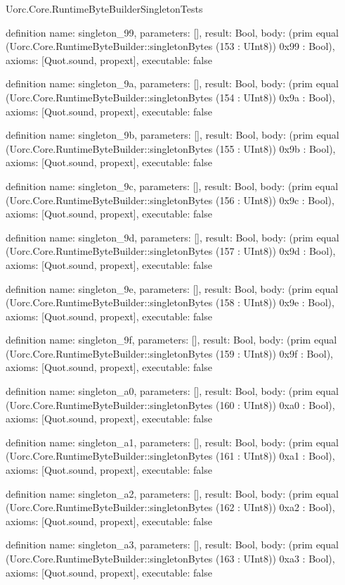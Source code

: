 \begin{lexlean}{Uorc.Core.RuntimeByteBuilderSingletonTests}
\begin{semanticmodule}
definition{
  name: singleton_99,
  parameters: [],
  result: Bool,
  body: (prim equal (Uorc.Core.RuntimeByteBuilder::singletonBytes (153 : UInt8)) 0x99 : Bool),
  axioms: [Quot.sound, propext],
  executable: false
}

definition{
  name: singleton_9a,
  parameters: [],
  result: Bool,
  body: (prim equal (Uorc.Core.RuntimeByteBuilder::singletonBytes (154 : UInt8)) 0x9a : Bool),
  axioms: [Quot.sound, propext],
  executable: false
}

definition{
  name: singleton_9b,
  parameters: [],
  result: Bool,
  body: (prim equal (Uorc.Core.RuntimeByteBuilder::singletonBytes (155 : UInt8)) 0x9b : Bool),
  axioms: [Quot.sound, propext],
  executable: false
}

definition{
  name: singleton_9c,
  parameters: [],
  result: Bool,
  body: (prim equal (Uorc.Core.RuntimeByteBuilder::singletonBytes (156 : UInt8)) 0x9c : Bool),
  axioms: [Quot.sound, propext],
  executable: false
}

definition{
  name: singleton_9d,
  parameters: [],
  result: Bool,
  body: (prim equal (Uorc.Core.RuntimeByteBuilder::singletonBytes (157 : UInt8)) 0x9d : Bool),
  axioms: [Quot.sound, propext],
  executable: false
}

definition{
  name: singleton_9e,
  parameters: [],
  result: Bool,
  body: (prim equal (Uorc.Core.RuntimeByteBuilder::singletonBytes (158 : UInt8)) 0x9e : Bool),
  axioms: [Quot.sound, propext],
  executable: false
}

definition{
  name: singleton_9f,
  parameters: [],
  result: Bool,
  body: (prim equal (Uorc.Core.RuntimeByteBuilder::singletonBytes (159 : UInt8)) 0x9f : Bool),
  axioms: [Quot.sound, propext],
  executable: false
}

definition{
  name: singleton_a0,
  parameters: [],
  result: Bool,
  body: (prim equal (Uorc.Core.RuntimeByteBuilder::singletonBytes (160 : UInt8)) 0xa0 : Bool),
  axioms: [Quot.sound, propext],
  executable: false
}

definition{
  name: singleton_a1,
  parameters: [],
  result: Bool,
  body: (prim equal (Uorc.Core.RuntimeByteBuilder::singletonBytes (161 : UInt8)) 0xa1 : Bool),
  axioms: [Quot.sound, propext],
  executable: false
}

definition{
  name: singleton_a2,
  parameters: [],
  result: Bool,
  body: (prim equal (Uorc.Core.RuntimeByteBuilder::singletonBytes (162 : UInt8)) 0xa2 : Bool),
  axioms: [Quot.sound, propext],
  executable: false
}

definition{
  name: singleton_a3,
  parameters: [],
  result: Bool,
  body: (prim equal (Uorc.Core.RuntimeByteBuilder::singletonBytes (163 : UInt8)) 0xa3 : Bool),
  axioms: [Quot.sound, propext],
  executable: false
}


\end{semanticmodule}
\end{lexlean}
